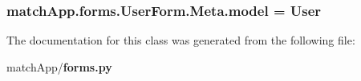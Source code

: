 \subsubsection[{model}]{\setlength{\rightskip}{0pt plus 5cm}match\+App.\+forms.\+User\+Form.\+Meta.\+model = User\hspace{0.3cm}{\ttfamily [static]}}\label{classmatch_app_1_1forms_1_1_user_form_1_1_meta_a5d9648ab073e418b0cfa6b4883c32423}


The documentation for this class was generated from the following file\+:\begin{DoxyCompactItemize}
\item 
match\+App/{\bf forms.\+py}\end{DoxyCompactItemize}
